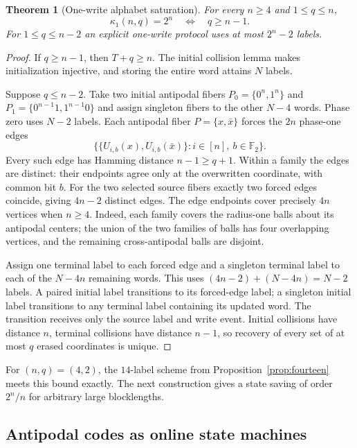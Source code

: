 \documentclass[11pt,a4paper]{article}
\newtheorem{theorem}{Theorem}[section]
\newcommand{\F}{\mathbb F_2}
\begin{document}
\begin{theorem}[One-write alphabet saturation]\label{thm:v3threshold}
For every $n\ge4$ and $1\le q\le n$,
\[
 \boxed{\ \kappa_1(n,q)=2^n\quad\Longleftrightarrow\quad q\ge n-1.\ }
\]
For $1\le q\le n-2$ an explicit one-write protocol uses at most $2^n-2$ labels.
\end{theorem}
\begin{proof}
If $q\ge n-1$, then $T+q\ge n$. The initial collision lemma makes initialization injective, and storing the entire word attains $N$ labels.

Suppose $q\le n-2$. Take two initial antipodal fibers $P_0=\{0^n,1^n\}$ and $P_1=\{0^{n-1}1,1^{n-1}0\}$ and assign singleton fibers to the other $N-4$ words. Phase zero uses $N-2$ labels. Each antipodal fiber $P=\{x,\bar x\}$ forces the $2n$ phase-one edges
\[
 \bigl\{\{U_{i,b}(x),U_{i,b}(\bar x)\}:i\in[n],\ b\in\F\bigr\}.
\]
Every such edge has Hamming distance $n-1\ge q+1$. Within a family the edges are distinct: their endpoints agree only at the overwritten coordinate, with common bit $b$. For the two selected source fibers exactly two forced edges coincide, giving $4n-2$ distinct edges. The edge endpoints cover precisely $4n$ vertices when $n\ge4$. Indeed, each family covers the radius-one balls about its antipodal centers; the union of the two families of balls has four overlapping vertices, and the remaining cross-antipodal balls are disjoint.

Assign one terminal label to each forced edge and a singleton terminal label to each of the $N-4n$ remaining words. This uses $(4n-2)+(N-4n)=N-2$ labels. A paired initial label transitions to its forced-edge label; a singleton initial label transitions to any terminal label containing its updated word. The transition receives only the source label and write event. Initial collisions have distance $n$, terminal collisions have distance $n-1$, so recovery of every set of at most $q$ erased coordinates is unique.
\end{proof}

For $(n,q)=(4,2)$, the $14$-label scheme from Proposition~\ref{prop:fourteen} meets this bound exactly. The next construction gives a state saving of order $2^n/n$ for arbitrary large blocklengths.

\subsection{Antipodal codes as online state machines}
\end{document}

